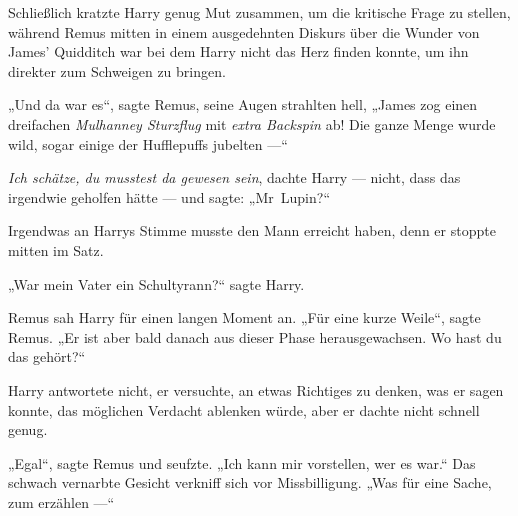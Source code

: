 Schließlich kratzte Harry genug Mut zusammen, um die kritische Frage zu stellen, während Remus mitten in einem ausgedehnten Diskurs über die Wunder von James’ Quidditch war bei dem Harry nicht das Herz finden konnte, um ihn direkter zum Schweigen zu bringen.

„Und da war es“, sagte Remus, seine Augen strahlten hell,
„James zog einen dreifachen \emph{Mulhanney Sturzflug} mit \emph{extra Backspin} ab! Die ganze Menge wurde wild, sogar einige der Hufflepuffs jubelten —“

\emph{Ich schätze, du musstest da gewesen sein}, dachte Harry — nicht, dass das irgendwie geholfen hätte — und sagte:
„Mr~Lupin?“

Irgendwas an Harrys Stimme musste den Mann erreicht haben, denn er stoppte mitten im Satz.

„War mein Vater ein Schultyrann?“ sagte Harry.

Remus sah Harry für einen langen Moment an.
„Für eine kurze Weile“, sagte Remus.
„Er ist aber bald danach aus dieser Phase herausgewachsen. Wo hast du das gehört?“

Harry antwortete nicht, er versuchte, an etwas Richtiges zu denken, was er sagen konnte, das möglichen Verdacht ablenken würde, aber er dachte nicht schnell genug.

„Egal“, sagte Remus und seufzte.
„Ich kann mir vorstellen, wer es war.“ Das schwach vernarbte Gesicht verkniff sich vor Missbilligung.
„Was für eine Sache, zum erzählen —“

